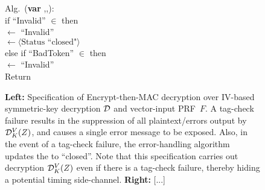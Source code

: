 \begin{figure}
{\medskip
Alg.\ ({\bf var} ,,):\\
\nudge if ``Invalid'' $\in$  then \\
\nudge\nudge {} $\gets$ ``Invalid'' \\
\nudge\nudge {} $\gets \langle
\mbox{Status ``closed"} \rangle$\\
\nudge else if ``BadToken'' $\in$  then \\
\nudge\nudge {} $\gets$ ``Invalid'' \\
\nudge Return 
} 
\caption{ {\bf
    Left:} Specification of Encrypt-then-MAC decryption over IV-based
  symmetric-key decryption $\mathcal{D}$ and vector-input PRF~$F$. A tag-check failure results in the
suppression of all plaintext/errors output by $\mathcal{D}^V_K(Z)$, and
causes a single error message to be exposed.  Also,
in the event of a tag-check failure, the error-handling algorithm
updates the  to
``closed''.  Note that this specification carries out decryption
$\mathcal{D}^V_K(Z)$ even if there is a tag-check failure, thereby hiding a
potential timing side-channel. 
%
{\bf
  Right: } [...]
}
\label{fig:EtM-aead}
\end{figure}
